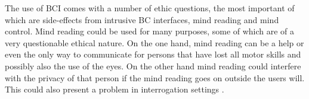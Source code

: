 The use of BCI comes with a number of ethic questions, the most important of which are side-effects from intrusive BC interfaces, mind reading and mind control.
Mind reading could be used for many purposes, some of which are of a very questionable ethical nature. On the one hand, mind reading can be a help or even the only way to communicate for persons that have lost all motor skills and possibly also the use of the eyes. On the other hand mind reading could interfere with the privacy of that person if the mind reading goes on outside the users will. This could also present a problem in interrogation settings .
